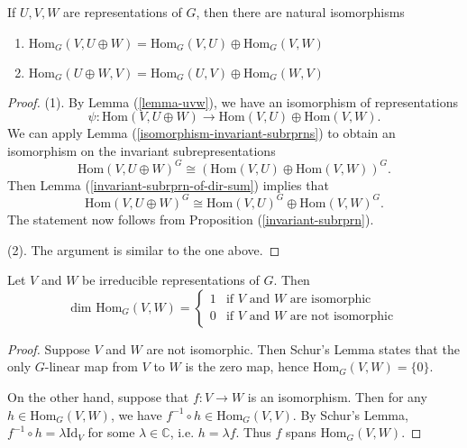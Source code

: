 \begin{cor}\label{invariant-subrprns-hom-spaces}
If  $U, V, W$ are representations of $G$, then there are natural isomorphisms
\begin{enumerate}
\item $\text{Hom}_G(V, U \oplus W) = \text{Hom}_G(V,U) \oplus \text{Hom}_G(V,W)$
\item $\text{Hom}_G(U \oplus W, V) = \text{Hom}_G(U, V) \oplus \text{Hom}_G(W ,V)$
\end{enumerate}
\end{cor}
\begin{proof}
(1). By Lemma (\ref{lemma-uvw}), we have an isomorphism of representations 
\[ \psi \colon \text{Hom}(V, U \oplus W) \to \text{Hom}(V, U) \oplus \text{Hom}(V,W). \]
We can apply Lemma (\ref{isomorphism-invariant-subrprns}) to obtain an isomorphism on the invariant subrepresentations
\[\text{Hom}(V, U \oplus W)^G \cong (\text{Hom}(V, U) \oplus \text{Hom}(V,W))^G.\]
Then Lemma (\ref{invariant-subrprn-of-dir-sum}) implies that 
\[\text{Hom}(V, U \oplus W)^G \cong \text{Hom}(V, U)^G \oplus \text{Hom}(V,W)^G. \]
The statement now follows from Proposition (\ref{invariant-subrprn}).

(2). The argument is similar to the one above.
\end{proof}

\begin{prop}\label{schurs-lemma-homvw}
Let $V$ and $W$ be irreducible representations of $G$.  Then
\[ \text{dim Hom}_G (V,W) =  \begin{cases} 
1 & \mbox{if $V$ and $W$ are isomorphic}  \\
0 &\mbox{if $V$ and $W$ are not isomorphic}
\end{cases} \]
\end{prop}
\begin{proof}
Suppose $V$ and $W$ are not isomorphic.  Then Schur's Lemma states that the only $G$-linear map from $V$ to $W$ is the zero map, hence $\text{Hom}_G(V,W) = \{ 0 \} $.

On the other hand, suppose that $f \colon V \to W$ is an isomorphism.  Then for any $h \in \text{Hom}_G(V,W)$, we have $f^{-1} \circ h \in \text{Hom}_G(V,V)$.  By Schur's Lemma, $f^{-1} \circ h = \lambda \text{Id}_V$ for some $\lambda \in \mathbb{C}$, i.e. $h = \lambda f$.  Thus $f$  spans $\text{Hom}_G(V,W)$.
\end{proof}

